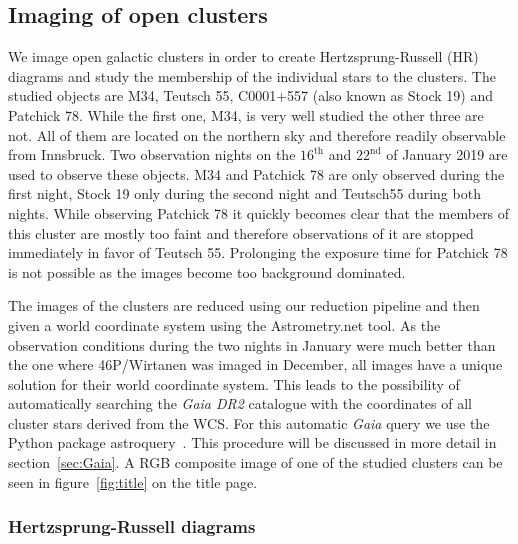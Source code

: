 \documentclass{article}
\begin{document}
\subsection{Imaging of open clusters}

We image open galactic clusters in order to create Hertzsprung-Russell (HR) diagrams and study the membership of the individual stars to the clusters. The studied objects are M34, Teutsch 55, C0001+557 (also known as Stock 19) and Patchick 78. While the first one, M34, is very well studied the other three are not. All of them are located on the northern sky and therefore readily observable from Innsbruck. Two observation nights on the $16^{\text{th}}$ and $22^{\text{nd}}$ of January 2019 are used to observe these objects. M34 and Patchick 78 are only observed during the first night, Stock 19  only during the second night and Teutsch55 during both nights. While observing Patchick 78 it quickly becomes clear that the members of this cluster are mostly too faint and therefore observations of it are stopped immediately in favor of Teutsch 55. Prolonging the exposure time for Patchick 78 is not possible as the images become too background dominated.

The images of the clusters are reduced using our reduction pipeline and then given a world coordinate system using the Astrometry.net tool. As the observation conditions during the two nights in January were much better than the one where 46P/Wirtanen was imaged in December, all images have a unique solution for their world coordinate system. This leads to the possibility of automatically searching the \textit{Gaia DR2} catalogue with the coordinates of all cluster stars derived from the WCS. For this automatic \textit{Gaia} query we use the Python package astroquery~\parencite{astroquery}. This procedure will be discussed in more detail in section~\ref{sec:Gaia}. A RGB composite image of one of the studied clusters can be seen in figure~\ref{fig:title} on the title page.

\subsubsection{Hertzsprung-Russell diagrams}
\end{document}
